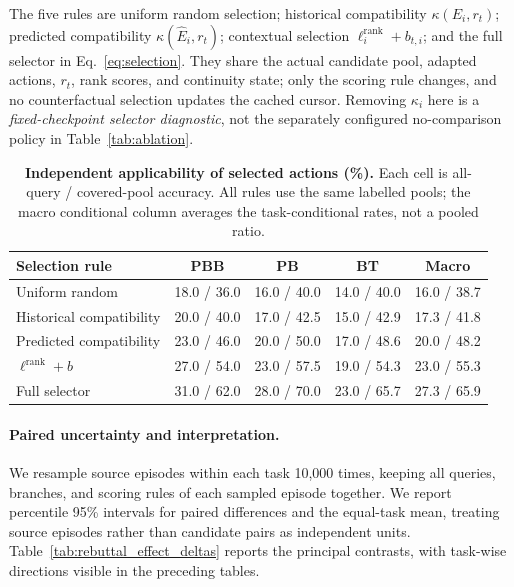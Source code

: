 The five rules are uniform random selection; historical compatibility $\kappa(E_i,r_t)$; predicted compatibility $\kappa(\widehat E_i,r_t)$; contextual selection $\ell_i^{\mathrm{rank}}+b_{t,i}$; and the full selector in Eq.~\eqref{eq:selection}.
They share the actual candidate pool, adapted actions, $r_t$, rank scores, and continuity state; only the scoring rule changes, and no counterfactual selection updates the cached cursor.
Removing $\kappa_i$ here is a \emph{fixed-checkpoint selector diagnostic}, not the separately configured no-comparison policy in Table~\ref{tab:ablation}.

\begin{table}[H]
\centering\footnotesize
\setlength{\tabcolsep}{4pt}
\caption{\textbf{Independent applicability of selected actions (\%).}
Each cell is all-query / covered-pool accuracy. All rules use the same labelled pools; the macro conditional column averages the task-conditional rates, not a pooled ratio.}
\label{tab:rebuttal_selection}
\begin{tabular}{@{}lcccc@{}}
\toprule
Selection rule & PBB & PB & BT & Macro \\
\midrule
Uniform random & 18.0 / 36.0 & 16.0 / 40.0 & 14.0 / 40.0 & 16.0 / 38.7 \\
Historical compatibility & 20.0 / 40.0 & 17.0 / 42.5 & 15.0 / 42.9 & 17.3 / 41.8 \\
Predicted compatibility & 23.0 / 46.0 & 20.0 / 50.0 & 17.0 / 48.6 & 20.0 / 48.2 \\
$\ell^{\mathrm{rank}}+b$ & 27.0 / 54.0 & 23.0 / 57.5 & 19.0 / 54.3 & 23.0 / 55.3 \\
Full selector & 31.0 / 62.0 & 28.0 / 70.0 & 23.0 / 65.7 & 27.3 / 65.9 \\
\bottomrule
\end{tabular}
\end{table}

\paragraph{Paired uncertainty and interpretation.}
We resample source episodes within each task 10,000 times, keeping all queries, branches, and scoring rules of each sampled episode together.
We report percentile 95\% intervals for paired differences and the equal-task mean, treating source episodes rather than candidate pairs as independent units.
Table~\ref{tab:rebuttal_effect_deltas} reports the principal contrasts, with task-wise directions visible in the preceding tables.


